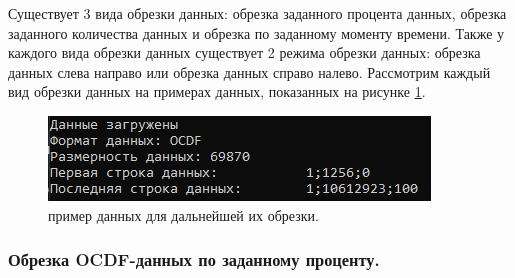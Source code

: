 {\standartFont

  \par Существует 3 вида обрезки данных: обрезка заданного процента данных, обрезка заданного количества данных и обрезка по заданному моменту времени. Также у каждого вида обрезки данных существует 2 режима обрезки данных: обрезка данных слева направо или обрезка данных справо налево. Рассмотрим каждый вид обрезки данных на примерах данных, показанных на рисунке \ref{fig:ExOCDFdataForCating}. 

  \begin{figure}[H]
    \centering
    \includegraphics{images/forDataManipulator/ExOCDFdataForCating.png}
    \caption{пример данных для дальнейшей их обрезки.} 
    \label{fig:ExOCDFdataForCating}
  \end{figure}

  \par
}

\subsubsection{ \standartTitleFont
  Обрезка OCDF-данных по заданному проценту. 
}

